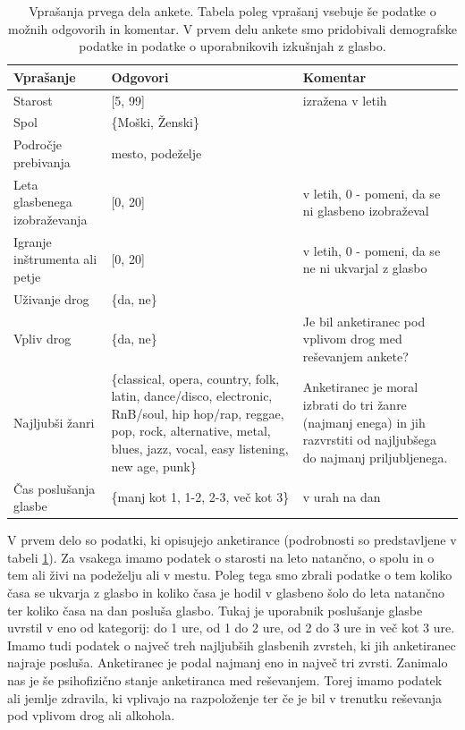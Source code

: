 \documentclass[a4paper, 12pt]{book}
\begin{document}
{\begin{table}[!hbt]
\begin{center}
\caption{Vprašanja prvega dela ankete. Tabela poleg vprašanj vsebuje še podatke o možnih odgovorih in komentar. V prvem delu ankete smo pridobivali demografske podatke in podatke o uporabnikovih izkušnjah z glasbo.}
\begin{tabular}{| p{3.5cm} | p{4.5cm} | p{4.5cm} |}
\hline
Vprašanje & Odgovori & Komentar \\ \hline \hline
Starost & [5, 99] & izražena v letih \\ \hline
Spol & \{Moški, Ženski\} & \\ \hline
Področje prebivanja & {mesto, podeželje} & \\ \hline
Leta glasbenega izobraževanja & [0, 20] & v letih, 0 - pomeni, da se ni glasbeno izobraževal \\ \hline
Igranje inštrumenta ali petje & [0, 20] & v letih, 0 - pomeni, da se ne ni ukvarjal z glasbo \\ \hline
Uživanje drog & \{da, ne\} & \\ \hline
Vpliv drog & \{da, ne\} &  Je bil anketiranec pod vplivom drog med reševanjem ankete? \\ \hline
Najljubši žanri & \{classical, opera, country, folk, latin, dance/disco, electronic, RnB/soul, hip hop/rap, reggae, pop, rock, alternative, metal, blues, jazz, vocal, easy listening, new age, punk\} & Anketiranec je moral izbrati do tri žanre (najmanj enega) in jih razvrstiti od najljubšega do najmanj priljubljenega. \\ \hline
Čas poslušanja glasbe & \{manj kot 1, 1-2, 2-3, več kot 3\} & v urah na dan \\ \hline

\end{tabular}
\label{prvidel}
\end{center}
\end{table} 

V prvem delo so podatki, ki opisujejo anketirance (podrobnosti so predstavljene v tabeli \ref{prvidel}). Za vsakega imamo podatek o starosti na leto natančno, o spolu in o tem ali živi na podeželju ali v mestu. Poleg tega smo zbrali podatke o tem koliko časa se ukvarja z glasbo in koliko časa je hodil v glasbeno šolo do leta natančno ter koliko časa na dan posluša glasbo. Tukaj je uporabnik poslušanje glasbe uvrstil v eno od kategorij: do 1 ure, od 1 do 2 ure, od 2 do 3 ure in več kot 3 ure. Imamo tudi podatek o največ treh najljubših glasbenih zvrsteh, ki jih anketiranec najraje posluša. Anketiranec je podal najmanj eno in največ tri zvrsti. Zanimalo nas je še psihofizično stanje anketiranca med reševanjem. Torej imamo podatek ali jemlje zdravila, ki vplivajo na razpoloženje ter če je bil v trenutku reševanja pod vplivom drog ali alkohola. 

}
\end{document}
